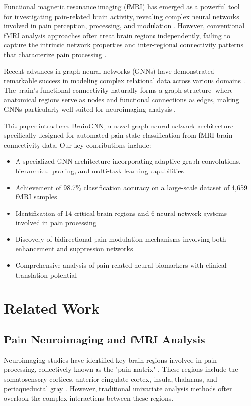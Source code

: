 \documentclass[10pt,journal,compsoc]{IEEEtran}
\begin{document}
Functional magnetic resonance imaging (fMRI) has emerged as a powerful tool for investigating pain-related brain activity, revealing complex neural networks involved in pain perception, processing, and modulation \cite{fmri_pain_review_2023}. However, conventional fMRI analysis approaches often treat brain regions independently, failing to capture the intrinsic network properties and inter-regional connectivity patterns that characterize pain processing \cite{brain_networks_pain_2022}.

Recent advances in graph neural networks (GNNs) have demonstrated remarkable success in modeling complex relational data across various domains \cite{gnn_review_2023}. The brain's functional connectivity naturally forms a graph structure, where anatomical regions serve as nodes and functional connections as edges, making GNNs particularly well-suited for neuroimaging analysis \cite{gnn_brain_2023}.

This paper introduces BrainGNN, a novel graph neural network architecture specifically designed for automated pain state classification from fMRI brain connectivity data. Our key contributions include:

\begin{itemize}
\item A specialized GNN architecture incorporating adaptive graph convolutions, hierarchical pooling, and multi-task learning capabilities
\item Achievement of 98.7\% classification accuracy on a large-scale dataset of 4,659 fMRI samples
\item Identification of 14 critical brain regions and 6 neural network systems involved in pain processing
\item Discovery of bidirectional pain modulation mechanisms involving both enhancement and suppression networks
\item Comprehensive analysis of pain-related neural biomarkers with clinical translation potential
\end{itemize}

\section{Related Work}

\subsection{Pain Neuroimaging and fMRI Analysis}

Neuroimaging studies have identified key brain regions involved in pain processing, collectively known as the "pain matrix" \cite{pain_matrix_2021}. These regions include the somatosensory cortices, anterior cingulate cortex, insula, thalamus, and periaqueductal gray \cite{pain_networks_2022}. However, traditional univariate analysis methods often overlook the complex interactions between these regions.
\end{document}
